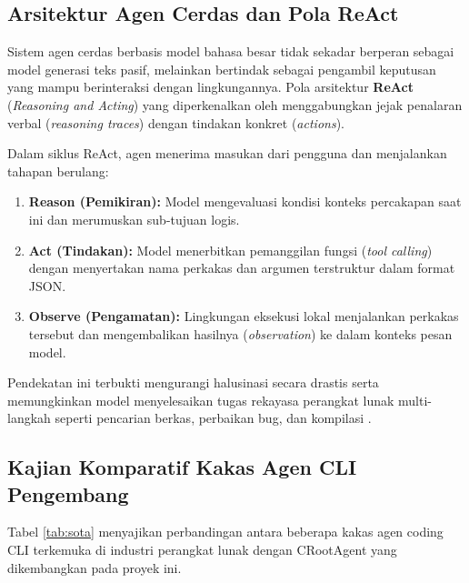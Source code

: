 \subsection{Arsitektur Agen Cerdas dan Pola ReAct}
Sistem agen cerdas berbasis model bahasa besar tidak sekadar berperan sebagai model generasi teks pasif, melainkan bertindak sebagai pengambil keputusan yang mampu berinteraksi dengan lingkungannya. Pola arsitektur \textbf{ReAct} (\textit{Reasoning and Acting}) yang diperkenalkan oleh \cite{yao2023react} menggabungkan jejak penalaran verbal (\textit{reasoning traces}) dengan tindakan konkret (\textit{actions}). 

Dalam siklus ReAct, agen menerima masukan dari pengguna dan menjalankan tahapan berulang:
\begin{enumerate}
    \item \textbf{Reason (Pemikiran):} Model mengevaluasi kondisi konteks percakapan saat ini dan merumuskan sub-tujuan logis.
    \item \textbf{Act (Tindakan):} Model menerbitkan pemanggilan fungsi (\textit{tool calling}) dengan menyertakan nama perkakas dan argumen terstruktur dalam format JSON.
    \item \textbf{Observe (Pengamatan):} Lingkungan eksekusi lokal menjalankan perkakas tersebut dan mengembalikan hasilnya (\textit{observation}) ke dalam konteks pesan model.
\end{enumerate}
Pendekatan ini terbukti mengurangi halusinasi secara drastis serta memungkinkan model menyelesaikan tugas rekayasa perangkat lunak multi-langkah seperti pencarian berkas, perbaikan bug, dan kompilasi \cite{schick2023toolformer}.

\subsection{Kajian Komparatif Kakas Agen CLI Pengembang}
Tabel \ref{tab:sota} menyajikan perbandingan antara beberapa kakas agen coding CLI terkemuka di industri perangkat lunak dengan CRootAgent yang dikembangkan pada proyek ini.

